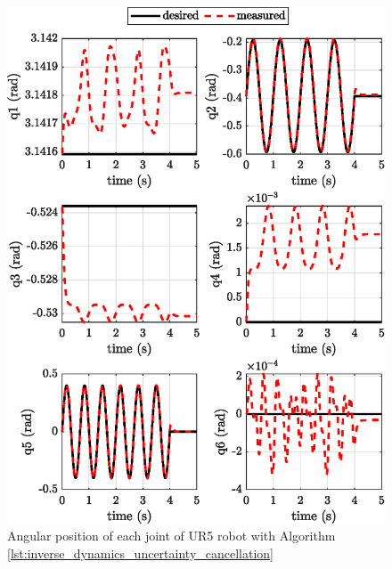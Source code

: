 \begin{figure}[H]
    \centering
    \includegraphics{images/act_2.5/joint_position.eps}
    \caption{Angular position of each joint of UR5 robot with Algorithm \ref{lst:inverse_dynamics_uncertainty_cancellation}}
    \label{fig:act_2.5_joint_position}
\end{figure}


